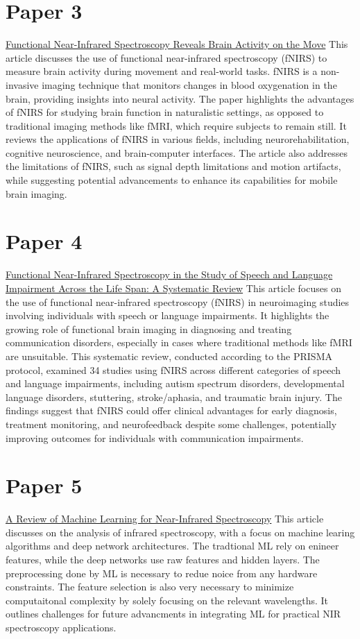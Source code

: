 \documentclass[12pt]{article}
\begin{document}
\section{Paper 3}
\href{https://www.ncbi.nlm.nih.gov/pmc/articles/PMC9231602/}{Functional Near-Infrared Spectroscopy Reveals Brain Activity on the Move}
This article discusses the use of functional near-infrared spectroscopy (fNIRS) to measure brain activity during movement and real-world tasks. fNIRS is a non-invasive imaging technique that monitors changes in blood oxygenation in the brain, providing insights into neural activity. The paper highlights the advantages of fNIRS for studying brain function in naturalistic settings, as opposed to traditional imaging methods like fMRI, which require subjects to remain still. It reviews the applications of fNIRS in various fields, including neurorehabilitation, cognitive neuroscience, and brain-computer interfaces. The article also addresses the limitations of fNIRS, such as signal depth limitations and motion artifacts, while suggesting potential advancements to enhance its capabilities for mobile brain imaging.

\section{Paper 4}
\href{https://pubs.asha.org/doi/10.1044/2020_AJSLP-19-00050}{Functional Near-Infrared Spectroscopy in the Study of Speech and Language Impairment Across the Life Span: A Systematic Review}
This article focuses on the use of functional near-infrared spectroscopy (fNIRS) in neuroimaging studies involving individuals with speech or language impairments. It highlights the growing role of functional brain imaging in diagnosing and treating communication disorders, especially in cases where traditional methods like fMRI are unsuitable. This systematic review, conducted according to the PRISMA protocol, examined 34 studies using fNIRS across different categories of speech and language impairments, including autism spectrum disorders, developmental language disorders, stuttering, stroke/aphasia, and traumatic brain injury. The findings suggest that fNIRS could offer clinical advantages for early diagnosis, treatment monitoring, and neurofeedback despite some challenges, potentially improving outcomes for individuals with communication impairments.

\section{Paper 5}
\href{https://pmc.ncbi.nlm.nih.gov/articles/PMC9784128/}{A Review of Machine Learning for Near-Infrared Spectroscopy}
This article discusses on the analysis of infrared spectroscopy, with a focus on machine learing algorithms and deep network architectures. The tradtional ML rely on enineer features, while the deep networks use raw features and hidden layers. The preprocessing done by ML is necessary to redue noice from any hardware constraints. The feature selection is also very necessary to minimize computaitonal complexity by solely focusing on the relevant wavelengths. It outlines challenges for future advancments in integrating ML for practical NIR spectroscopy applications. 
\end{document}
